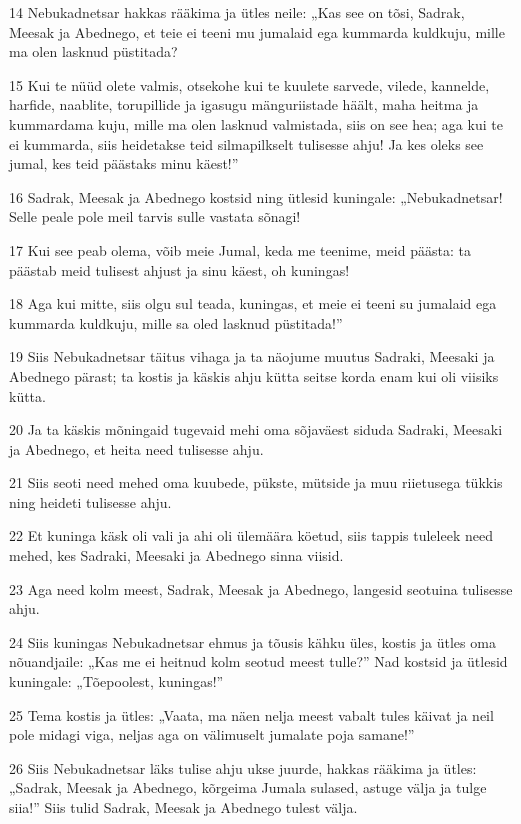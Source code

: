 \par 14 Nebukadnetsar hakkas rääkima ja ütles neile: „Kas see on tõsi, Sadrak, Meesak ja Abednego, et teie ei teeni mu jumalaid ega kummarda kuldkuju, mille ma olen lasknud püstitada?
\par 15 Kui te nüüd olete valmis, otsekohe kui te kuulete sarvede, vilede, kannelde, harfide, naablite, torupillide ja igasugu mänguriistade häält, maha heitma ja kummardama kuju, mille ma olen lasknud valmistada, siis on see hea; aga kui te ei kummarda, siis heidetakse teid silmapilkselt tulisesse ahju! Ja kes oleks see jumal, kes teid päästaks minu käest!”
\par 16 Sadrak, Meesak ja Abednego kostsid ning ütlesid kuningale: „Nebukadnetsar! Selle peale pole meil tarvis sulle vastata sõnagi!
\par 17 Kui see peab olema, võib meie Jumal, keda me teenime, meid päästa: ta päästab meid tulisest ahjust ja sinu käest, oh kuningas!
\par 18 Aga kui mitte, siis olgu sul teada, kuningas, et meie ei teeni su jumalaid ega kummarda kuldkuju, mille sa oled lasknud püstitada!”
\par 19 Siis Nebukadnetsar täitus vihaga ja ta näojume muutus Sadraki, Meesaki ja Abednego pärast; ta kostis ja käskis ahju kütta seitse korda enam kui oli viisiks kütta.
\par 20 Ja ta käskis mõningaid tugevaid mehi oma sõjaväest siduda Sadraki, Meesaki ja Abednego, et heita need tulisesse ahju.
\par 21 Siis seoti need mehed oma kuubede, pükste, mütside ja muu riietusega tükkis ning heideti tulisesse ahju.
\par 22 Et kuninga käsk oli vali ja ahi oli ülemäära köetud, siis tappis tuleleek need mehed, kes Sadraki, Meesaki ja Abednego sinna viisid.
\par 23 Aga need kolm meest, Sadrak, Meesak ja Abednego, langesid seotuina tulisesse ahju.
\par 24 Siis kuningas Nebukadnetsar ehmus ja tõusis kähku üles, kostis ja ütles oma nõuandjaile: „Kas me ei heitnud kolm seotud meest tulle?” Nad kostsid ja ütlesid kuningale: „Tõepoolest, kuningas!”
\par 25 Tema kostis ja ütles: „Vaata, ma näen nelja meest vabalt tules käivat ja neil pole midagi viga, neljas aga on välimuselt jumalate poja samane!”
\par 26 Siis Nebukadnetsar läks tulise ahju ukse juurde, hakkas rääkima ja ütles: „Sadrak, Meesak ja Abednego, kõrgeima Jumala sulased, astuge välja ja tulge siia!” Siis tulid Sadrak, Meesak ja Abednego tulest välja.
